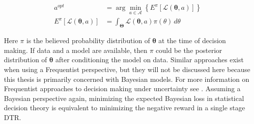 \begin{align}
	a^{opt} &=  \arg\min_{a \in \mathcal{A}} \left\{ 	E^{\pi}\left[ \mathcal{L}(\boldsymbol{\theta},a) \right] \right\} \\
	E^{\pi}\left[ \mathcal{L}(\boldsymbol{\theta},a) \right] &= \int_{\boldsymbol{\Theta}} \mathcal{L}(\boldsymbol{\theta}, a)  \pi(\theta) \, d\theta\label{reimann_stieltjes}
\end{align}

\noindent Here $\pi$ is the believed probability distribution of $\boldsymbol{\theta}$ at the time of decision making.  If data and a model are available, then $\pi$ could be the posterior distribution of $\boldsymbol{\theta}$ after conditioning the model on data.  Similar approaches exist when using a Frequentist perspective, but they will not be discussed here because this thesis is primarily concerned with Bayesian models.  For more information on Frequentist approaches to decision making under uncertainty see \cite{berger2013statistical}.  Assuming a Bayesian perspective again, minimizing the expected Bayesian loss in statistical decision theory is equivalent to minimizing the negative reward in a single stage DTR.  